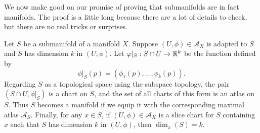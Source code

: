 We now make good on our promise of proving that submanifolds are in fact manifolds. The proof is a little long because there are a lot of details to check, but there are no real tricks or surprises. 

\begin{proposition} \label{submanifolds-are-manifolds}
	Let $S$ be a submanifold of a manifold $X$. Suppose $(U, \phi) \in \mathscr{A}_X$ is adapted to $S$ and $S$ has dimension $k$ in $(U, \phi)$. Let $\varphi|_S : S \cap U \to \mathbb{R}^k$ be the function defined by 
	\[ \phi|_S(p) = (\phi_1(p), \dotsc, \phi_k(p)). \]
	Regarding $S$ as a topological space using the subspace topology, the pair $(S \cap U, \phi|_S)$ is a chart on $S$, and the set of all charts of this form is an atlas on $S$. Thus $S$ becomes a manifold if we equip it with the corresponding maximal atlas $\mathscr{A}_S$. Finally, for any $x \in S$, if $(U, \phi) \in \mathscr{A}_X$ is a slice chart for $S$ containing $x$ such that $S$ has dimension $k$ in $(U,\phi)$, then $\dim_x(S) = k$. 
\end{proposition}

